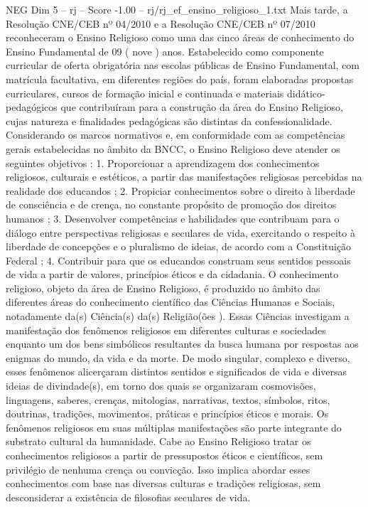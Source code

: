 \begin{textsample}{NEG Dim 5 – rj – Score -1.00 – rj/rj\_ef\_ensino\_religioso\_1.txt}
Mais tarde, a Resolução CNE/CEB nº 04/2010 e a Resolução CNE/CEB nº 07/2010 reconheceram o Ensino Religioso como uma das cinco áreas de conhecimento do Ensino Fundamental de 09 ( nove ) anos.
Estabelecido como componente curricular de oferta obrigatória nas escolas públicas de Ensino Fundamental, com matrícula facultativa, em diferentes regiões do país, foram elaboradas propostas curriculares, cursos de formação inicial e continuada e materiais didático-pedagógicos que contribuíram para a construção da área do Ensino Religioso, cujas natureza e finalidades pedagógicas são distintas da confessionalidade.
Considerando os marcos normativos e, em conformidade com as competências gerais estabelecidas no âmbito da BNCC, o Ensino Religioso deve atender os seguintes objetivos : 1.
Proporcionar a aprendizagem dos conhecimentos religiosos, culturais e estéticos, a partir das manifestações religiosas percebidas na realidade dos educandos ; 2.
Propiciar conhecimentos sobre o direito à liberdade de consciência e de crença, no constante propósito de promoção dos direitos humanos ; 3.
Desenvolver competências e habilidades que contribuam para o diálogo entre perspectivas religiosas e seculares de vida, exercitando o respeito à liberdade de concepções e o pluralismo de ideias, de acordo com a Constituição Federal ; 4.
Contribuir para que os educandos construam seus sentidos pessoais de vida a partir de valores, princípios éticos e da cidadania.
O conhecimento religioso, objeto da área de Ensino Religioso, é produzido no âmbito das diferentes áreas do conhecimento científico das Ciências Humanas e Sociais, notadamente da(s) Ciência(s) da(s) Religião(ões ).
Essas Ciências investigam a manifestação dos fenômenos religiosos em diferentes culturas e sociedades enquanto um dos bens simbólicos resultantes da busca humana por respostas aos enigmas do mundo, da vida e da morte.
De modo singular, complexo e diverso, esses fenômenos alicerçaram distintos sentidos e significados de vida e diversas ideias de divindade(s), em torno dos quais se organizaram cosmovisões, linguagens, saberes, crenças, mitologias, narrativas, textos, símbolos, ritos, doutrinas, tradições, movimentos, práticas e princípios éticos e morais.
Os fenômenos religiosos em suas múltiplas manifestações são parte integrante do substrato cultural da humanidade.
Cabe ao Ensino Religioso tratar os conhecimentos religiosos a partir de pressupostos éticos e científicos, sem privilégio de nenhuma crença ou convicção.
Isso implica abordar esses conhecimentos com base nas diversas culturas e tradições religiosas, sem desconsiderar a existência de filosofias seculares de vida.

\end{textsample}
